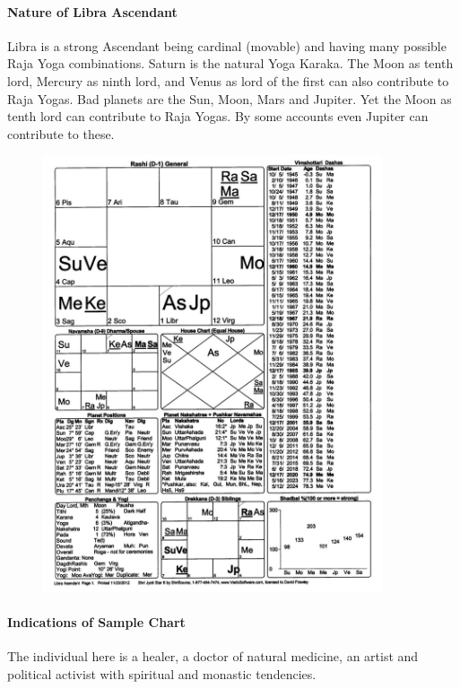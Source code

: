 \paragraph{Nature of Libra Ascendant}

 

Libra is a strong Ascendant being cardinal (movable) and having many possible Raja Yoga combinations. Saturn is the natural Yoga Karaka. The Moon as tenth lord, Mercury as ninth lord, and Venus as lord of the first can also contribute to Raja Yogas. Bad planets are the Sun, Moon, Mars and Jupiter. Yet the Moon as tenth lord can contribute to Raja Yogas. By some accounts even Jupiter can contribute to these.

 

\begin{figure}[h]
\centering
\includegraphics[width=10cm]{pics/Libra-Ascendant.jpg}
\caption{}
\end{figure}
 

 

\paragraph{Indications of Sample Chart}

 

The individual here is a healer, a doctor of natural medicine, an artist and political activist with spiritual and monastic tendencies.


